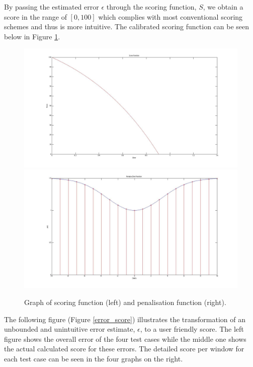 \documentclass[11pt,a4paper]{article}
\begin{document}
\noindent
By passing the estimated error $\epsilon$ through the scoring function, $S$, we obtain a score in the range of $[0,100]$ which complies with most conventional scoring schemes and thus is more intuitive. The calibrated scoring function can be seen below in Figure \ref{score_function}.

\begin{figure}[H]
\centering
\includegraphics[scale=0.15]{Score_Function.jpg}
\includegraphics[scale=0.15]{Penalise_Error_Function.jpg}

\caption{Graph of scoring function (left) and penalisation function (right).}
\label{score_function}
\end{figure}

\noindent
The following figure (Figure \ref{error_score}) illustrates the transformation of an unbounded and unintuitive error estimate, $\epsilon$, to a user friendly score. The left figure shows the overall error of the four test cases while the middle one shows the actual calculated score for these errors. The detailed score per window for each test case can be seen in the four graphs on the right.
\end{document}
